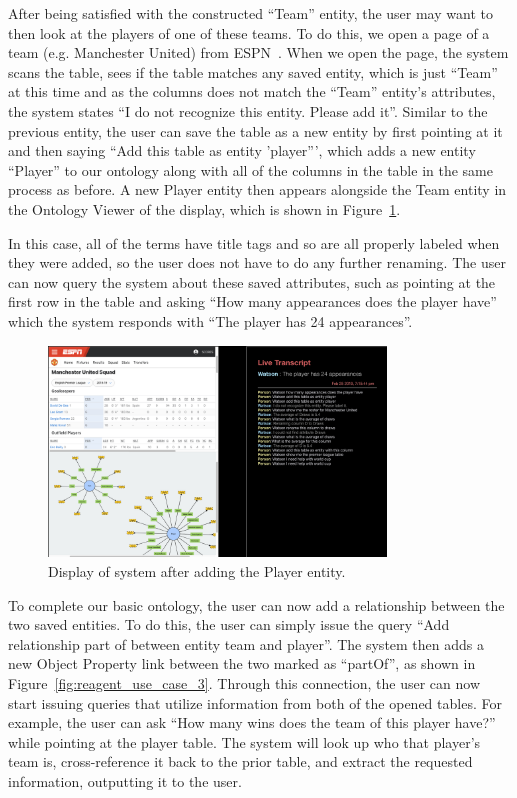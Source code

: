 After being satisfied with the constructed ``Team'' entity, the user may want
to then look at the players of one of these teams. To
do this, we open a page of a team (e.g. Manchester United) from ESPN~\cite{espn_squad_table}. When we open
the page, the system scans the table, sees if the table matches
any saved entity, which is just ``Team'' at this time and as the columns does not match the ``Team'' entity's attributes,
the system states ``I do not recognize this entity. Please add it''. Similar
to the previous entity, the user
can save the table as a new entity by first pointing at it and then saying ``Add this table as entity 'player''', which
adds a new entity ``Player'' to our ontology along with all of the columns in the
table in the same process as before. A new Player entity then appears
alongside the Team entity in the Ontology Viewer of the display, which
is shown in Figure~\ref{fig:reagent_use_case_2}.

In this case, all of the terms have title tags and so are all properly labeled when they were added, so the user does not have to do any further renaming. The user can
now query the system about these saved attributes, such as pointing at the first
row in the table and asking ``How many appearances does the player have'' which
the system responds with ``The player has 24 appearances''.

\begin{figure}[hbtp]
\centering
\includegraphics[width=0.8\textwidth]{chapters/03_reagent/figures/use_case_2.png}
\caption{Display of system after adding the Player entity.}
\label{fig:reagent_use_case_2}
\end{figure}

To complete our basic ontology, the user can now add a relationship
between the two saved entities. To do this, the user can simply issue
the query ``Add relationship part of between entity team and player''. The
system then adds a new Object Property link between the two marked as 
``partOf'', as shown in Figure~\ref{fig:reagent_use_case_3}. Through this connection,
the user can now start issuing queries that utilize information from both of the opened tables. For example,
the user can ask ``How many wins does the team of this player have?'' while pointing
at the player table. The system will look up who that player's team is, cross-reference it
back to the prior table, and extract the requested information, outputting it to the user.

